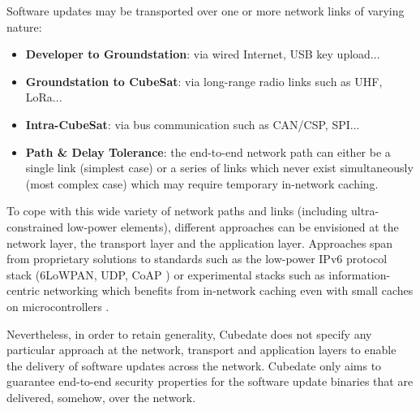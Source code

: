 Software updates may be transported over one or more network links of varying nature: 
\begin{itemize}
\item {\bf Developer to Groundstation}: via wired Internet, USB key upload...
\item {\bf Groundstation to CubeSat}: via long-range radio links such as UHF, LoRa...
\item {\bf Intra-CubeSat}: via bus communication such as CAN/CSP, SPI...
\item {\bf Path \& Delay Tolerance}: the end-to-end network path can either be a single link (simplest case) or a series of links which never exist simultaneously (most complex case) which may require temporary in-network caching.
\end{itemize}

To cope with this wide variety of network paths and links (including ultra-constrained low-power elements), different approaches can be envisioned at the network layer, the transport layer and the application layer. Approaches span from proprietary solutions to standards such as the low-power IPv6 protocol stack (6LoWPAN, UDP, CoAP \cite{morabito2020ietf}) or experimental stacks such as information-centric networking which benefits from in-network caching even with small caches on microcontrollers \cite{hahm2017low}. 

Nevertheless, in order to retain generality, Cubedate does not specify any particular approach at the network, transport and application layers to enable the delivery of software updates across the network.
Cubedate only aims to guarantee end-to-end security properties for the software update binaries that are delivered, somehow, over the network.

